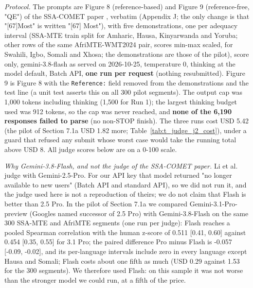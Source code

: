 \emph{Protocol.} The prompts are Figure 8 (reference-based) and Figure 9 (reference-free, "QE") of the SSA-COMET paper \citep{li2025ssacomet}, verbatim (Appendix J; the only change is that "{[}67{]}Most" is written "{[}67{]} Most"), with five demonstrations, one per adequacy interval (SSA-MTE train split for Amharic, Hausa, Kinyarwanda and Yoruba; other rows of the same AfriMTE-WMT2024 pair, scores min-max scaled, for Swahili, Igbo, Somali and Xhosa; the demonstrations are those of the pilot), score only, gemini-3.8-flash as served on 2026-10-25, temperature 0, thinking at the model default, Batch API, \textbf{one run per request} (nothing resubmitted). Figure 9 is Figure 8 with the \texttt{Reference:} field removed from the demonstrations and the test line (a unit test asserts this on all 300 pilot segments). The output cap was 1,000 tokens including thinking (1,500 for Run 1); the largest thinking budget used was 912 tokens, so the cap was never reached, and \textbf{none of the 6,190 responses failed to parse} (no non-STOP finish). The three runs cost USD 5.42 (the pilot of Section 7.1a USD 1.82 more; Table~\ref{tab:t_judge_j2_cost}), under a guard that refused any submit whose worst case would take the running total above USD 8. All judge scores below are on a 0-100 scale.

\emph{Why Gemini-3.8-Flash, and not the judge of the SSA-COMET paper.} Li et al. \citep{li2025ssacomet} judge with Gemini-2.5-Pro. For our API key that model returned "no longer available to new users" (Batch API and standard API), so we did not run it, and the judge used here is not a reproduction of theirs; we do not claim that Flash is better than 2.5 Pro. In the pilot of Section 7.1a we compared Gemini-3.1-Pro-preview (Google\textquotesingle s named successor of 2.5 Pro) with Gemini-3.8-Flash on the same 300 SSA-MTE and AfriMTE segments (one run per judge): Flash reaches a pooled Spearman correlation with the human z-score of 0.511 {[}0.41, 0.60{]} against 0.454 {[}0.35, 0.55{]} for 3.1 Pro; the paired difference Pro minus Flash is -0.057 {[}-0.09, -0.02{]}, and its per-language intervals include zero in every language except Hausa and Somali; Flash costs about one fifth as much (USD 0.29 against 1.53 for the 300 segments). We therefore used Flash: on this sample it was not worse than the stronger model we could run, at a fifth of the price.

